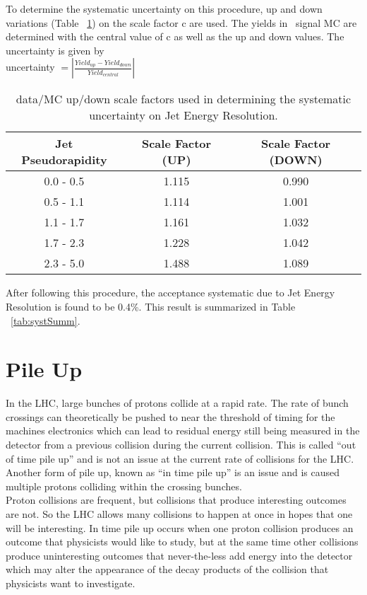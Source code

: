 To determine the systematic uncertainty on this procedure, up and down variations (Table ~\ref{tab:jer_scalefactor_updown}) on the scale factor c are used. The yields in \ttZ \ signal MC are determined with the central value of c as well as the up and down values. The uncertainty is given by\\
uncertainty $= | \frac{Yield _{up} - Yield _{down}}{Yield _{central}} | $

\begin{table}[h]
\begin{center}
\caption{\small \label{tab:jer_scalefactor_updown} data/MC up/down scale factors used in determining the systematic uncertainty on Jet Energy Resolution.}
\begin{tabular}{c|c|c}\hline
Jet Pseudorapidity & Scale Factor (UP) & Scale Factor (DOWN)\\ \hline \hline
0.0 - 0.5 & 1.115 & 0.990 \\
0.5 - 1.1 & 1.114 & 1.001 \\
1.1 - 1.7 & 1.161 & 1.032 \\
1.7 - 2.3 & 1.228 & 1.042 \\
2.3 - 5.0 & 1.488 & 1.089 \\
\hline
\hline
\end{tabular}
\end{center}
\end{table}

After following this procedure, the acceptance systematic due to Jet Energy Resolution is found to be 0.4\%. This result is summarized in Table ~\ref{tab:systSumm}.\\

\section{Pile Up}
In the LHC, large bunches of protons collide at a rapid rate. The rate of bunch crossings can theoretically be pushed to near the threshold of timing for the machines electronics which can lead to residual energy still being measured in the detector from a previous collision during the current collision. This is called ``out of time pile up'' and is not an issue at the current rate of collisions for the LHC. Another form of pile up, known as ``in time pile up'' is an issue and is caused multiple protons colliding within the crossing bunches.\\ 

Proton collisions are frequent, but collisions that produce interesting outcomes are not. So the LHC allows many collisions to happen at once in hopes that one will be interesting. In time pile up occurs when one proton collision produces an outcome that physicists would like to study, but at the same time other collisions produce uninteresting outcomes that never-the-less add energy into the detector which may alter the appearance of the decay products of the collision that physicists want to investigate.\\

